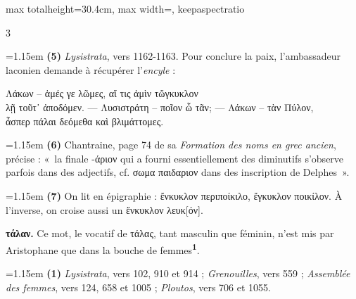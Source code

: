\documentclass[11pt,twoside]{book}
\newcommand{\italique}[1]{\textit{#1}}
\newcommand{\citComm}[1]{\begin{quoting}[vskip=0.4pt,leftmargin=0.7em,rightmargin=0.2em]#1\end{quoting}}
\newcommand{\marqueur}[1]{\textsuperscript{\color{rubricRed}\textbf{#1}}}
\begin{document}
\begin{adjustbox}{max totalheight=30.4cm, max width=\textwidth, keepaspectratio}
\begin{minipage}{\textwidth}
{\begin{multicols}{3}
\par\vspace{1.5pt}
\noindent\hangindent=1.15em {\color{sepiaNote}\textbf{(5)}} \italique{Lysistrata}, vers 1162-1163. Pour conclure la paix, l'ambassadeur laconien demande à récupérer l'\italique{encyle} :
\citComm{Λάκων -- ἁμές γε λῶμες, αἴ τις ἁμὶν τὤγκυκλον\\
λῇ τοῦτ᾽ ἀποδόμεν. --- Λυσιστράτη -- ποῖον ὦ τᾶν; --- Λάκων -- τὰν Πύλον,\\
ἇσπερ πάλαι δεόμεθα καὶ βλιμάττομες.}
\par\vspace{1.5pt}
\noindent\hangindent=1.15em {\color{sepiaNote}\textbf{(6)}} Chantraine, page 74 de sa \italique{Formation des noms en grec ancien}, précise : «~la finale -άριον qui a fourni essentiellement des diminutifs s'observe parfois dans des adjectifs, cf. σωμα παιδαριον dans des inscription de Delphes~».
\par\vspace{1.5pt}
\noindent\hangindent=1.15em {\color{sepiaNote}\textbf{(7)}} On lit en épigraphie : ἔνκυκλον περιποίκιλο, ἔγκυκλον ποικίλον. À l'inverse, on croise aussi un ἔνκυκλον λευκ[όν].
\par\vspace{1.5pt}
 \textbf{τάλαν.} Ce mot, le vocatif de τάλας, tant masculin que féminin, n'est mis par Aristophane que dans la bouche de femmes\marqueur{1}.
\par\vspace{1.5pt}
\par\vspace{1.2pt}\par\nopagebreak\vspace{1pt}\noindent\hangindent=1.15em {\color{sepiaNote}\textbf{(1)}} \italique{Lysistrata}, vers 102, 910 et 914 ; \italique{Grenouilles}, vers 559 ; \italique{Assemblée des femmes}, vers 124, 658 et 1005 ; \italique{Ploutos}, vers 706 et 1055.
\par\vspace{1.5pt}

\end{multicols}}
\end{minipage}
\end{adjustbox}
\end{document}
